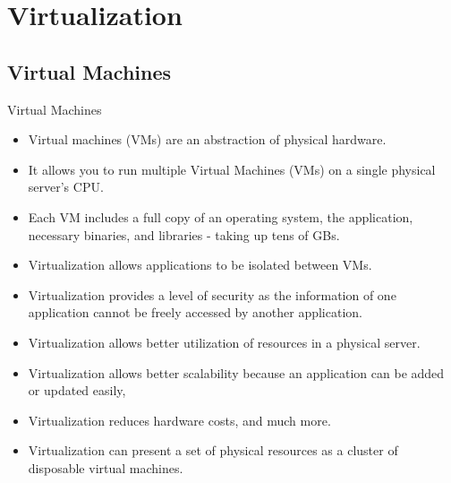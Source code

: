 

\section{Virtualization}\label{sec:virtualization}

\subsection{Virtual Machines}\label{subsec:virtual-machines}
\begin{frame}{Virtual Machines}
    \begin{itemize}[<+- | alert@+>]
        \item Virtual machines (VMs) are an abstraction of physical hardware.
        \item It allows you to run multiple Virtual Machines (VMs) on a single physical server's CPU\@.
        \item Each VM includes a full copy of an operating system, the application, necessary binaries, and libraries - taking up tens of GBs.
        \item Virtualization allows applications to be isolated between VMs.
        \item Virtualization provides a level of security as the information of one application cannot be freely accessed by another application.
        \item Virtualization allows better utilization of resources in a physical server.
        \item Virtualization allows better scalability because an application can be added or updated easily,
        \item Virtualization reduces hardware costs, and much more.
        \item Virtualization can present a set of physical resources as a cluster of disposable virtual machines.
    \end{itemize}
\end{frame}

